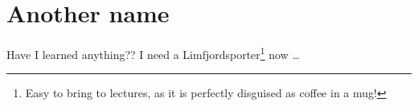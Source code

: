 
\chapter{Another name}
\label{chap:funl}

Have I learned anything?? I need a Limfjordsporter\footnote{Easy to bring to
  lectures, as it is perfectly disguised as coffee in a mug!} now \ldots

\lipsum
